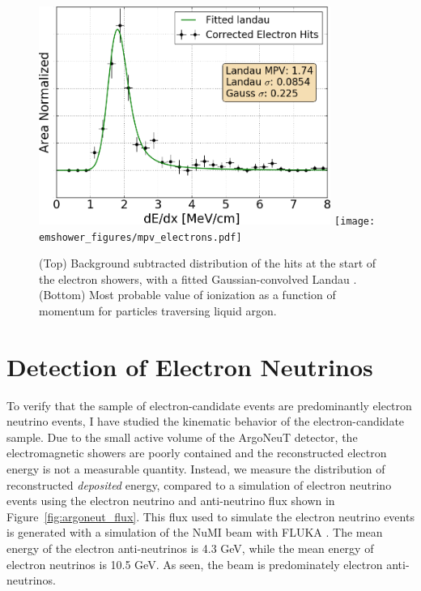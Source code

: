 \begin{figure}[htb]
  \centering
  \includegraphics[width=0.85\textwidth]{emshower_figures/fitted_electron_landau_trimmed.png}
  \texttt{[image: emshower\_figures/mpv\_electrons.pdf]}
  \caption{(Top) Background subtracted distribution of the hits at the start of the electron showers, with a fitted Gaussian-convolved Landau .  (Bottom) Most probable value of ionization as a function of momentum for particles traversing liquid argon.}
  \label{fig:mpv_electrons}
 \end{figure} 

\FloatBarrier

\section{\label{sec:electrons} Detection of Electron Neutrinos}

To verify that the sample of electron-candidate events are predominantly electron neutrino events, I have studied the kinematic behavior of the electron-candidate sample.  Due to the small active volume of the ArgoNeuT detector, the electromagnetic showers are poorly contained and the reconstructed electron energy is not a measurable quantity.  Instead, we measure the distribution of reconstructed {\em deposited} energy, compared to a simulation of electron neutrino events using the electron neutrino and anti-neutrino flux shown in Figure~\ref{fig:argoneut_flux}.  This flux used to simulate the electron neutrino events is generated with a simulation of the NuMI beam with FLUKA \cite{Aliaga:2016oaz}.  The mean energy of the electron anti-neutrinos is 4.3 GeV, while the mean energy of electron neutrinos is 10.5 GeV.  As seen, the beam is predominately electron anti-neutrinos.

